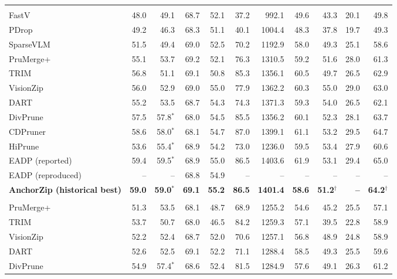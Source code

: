 \documentclass[10pt,a4paper]{article}
\begin{document}
{\begin{tabular}{lrrrrrrrrrr}
\rowcolor{black!12}\multicolumn{11}{c}{\textit{Retain 64 tokens}} \\
FastV & 48.0 & 49.1 & 68.7 & 52.1 & 37.2 & 992.1 & 49.6 & 43.3 & 20.1 & 49.8 \\
PDrop & 49.2 & 46.3 & 68.3 & 51.1 & 40.1 & 1004.4 & 48.3 & 37.8 & 19.7 & 49.3 \\
SparseVLM & 51.5 & 49.4 & 69.0 & 52.5 & 70.2 & 1192.9 & 58.0 & 49.3 & 25.1 & 58.6 \\
PruMerge+ & 55.1 & 53.7 & 69.2 & 52.1 & 76.3 & 1310.5 & 59.2 & 51.6 & 28.0 & 61.3 \\
TRIM & 56.8 & 51.1 & 69.1 & 50.8 & 85.3 & 1356.1 & 60.5 & 49.7 & 26.5 & 62.9 \\
VisionZip & 56.0 & 52.9 & 69.0 & 55.0 & 77.9 & 1362.2 & 60.3 & 55.0 & 29.0 & 63.0 \\
DART & 55.2 & 53.5 & 68.7 & 54.3 & 74.3 & 1371.3 & 59.3 & 54.0 & 26.5 & 62.1 \\
DivPrune & 57.5 & 57.8$^{*}$ & 68.0 & 54.5 & 85.5 & 1356.2 & 60.1 & 52.3 & 28.1 & 63.7 \\
CDPruner & 58.6 & 58.0$^{*}$ & 68.1 & 54.7 & 87.0 & 1399.1 & 61.1 & 53.2 & 29.5 & 64.7 \\
HiPrune & 53.6 & 55.4$^{*}$ & 68.9 & 54.2 & 73.0 & 1236.0 & 59.5 & 53.4 & 27.9 & 60.6 \\
EADP (reported) & 59.4 & 59.5$^{*}$ & 68.9 & 55.0 & 86.5 & 1403.6 & 61.9 & 53.1 & 29.4 & 65.0 \\
EADP (reproduced) & -- & -- & 68.8 & 54.9 & -- & -- & -- & -- & -- & -- \\
\textbf{AnchorZip (historical best)} & \textbf{59.0} & \textbf{59.0$^{*}$} & \textbf{69.1} & \textbf{55.2} & \textbf{86.5} & \textbf{1401.4} & \textbf{58.6} & \textbf{51.2$^{\dagger}$} & \textbf{--} & \textbf{64.2$^{\dagger}$} \\
\rowcolor{black!12}\multicolumn{11}{c}{\textit{Retain 32 tokens}} \\
PruMerge+ & 51.3 & 53.5 & 68.1 & 48.7 & 68.9 & 1255.2 & 54.6 & 45.2 & 25.5 & 57.1 \\
TRIM & 53.7 & 50.7 & 68.0 & 46.5 & 84.2 & 1259.3 & 57.1 & 39.5 & 22.8 & 58.9 \\
VisionZip & 52.2 & 52.4 & 68.7 & 52.0 & 70.6 & 1257.1 & 56.8 & 48.9 & 24.8 & 58.9 \\
DART & 52.6 & 52.5 & 69.1 & 52.2 & 71.1 & 1288.4 & 58.5 & 49.3 & 25.5 & 59.6 \\
DivPrune & 54.9 & 57.4$^{*}$ & 68.6 & 52.4 & 81.5 & 1284.9 & 57.6 & 49.1 & 26.3 & 61.2 \\

\end{tabular}}
\end{document}

